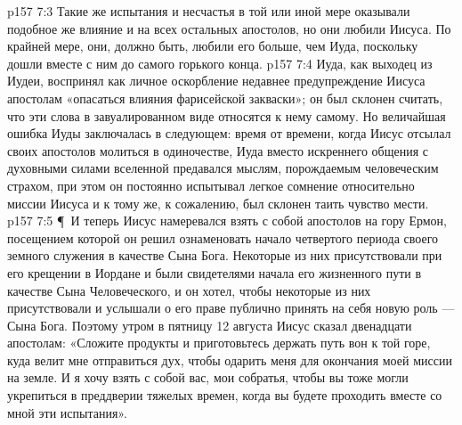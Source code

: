 \vs p157 7:3 Такие же испытания и несчастья в той или иной мере оказывали подобное же влияние и на всех остальных апостолов, но они любили Иисуса. По крайней мере, они, должно быть, любили его больше, чем Иуда, поскольку дошли вместе с ним до самого горького конца.
\vs p157 7:4 Иуда, как выходец из Иудеи, воспринял как личное оскорбление недавнее предупреждение Иисуса апостолам «опасаться влияния фарисейской закваски»; он был склонен считать, что эти слова в завуалированном виде относятся к нему самому. Но величайшая ошибка Иуды заключалась в следующем: время от времени, когда Иисус отсылал своих апостолов молиться в одиночестве, Иуда вместо искреннего общения с духовными силами вселенной предавался мыслям, порождаемым человеческим страхом, при этом он постоянно испытывал легкое сомнение относительно миссии Иисуса и к тому же, к сожалению, был склонен таить чувство мести.
\vs p157 7:5 \P\ И теперь Иисус намеревался взять с собой апостолов на гору Ермон, посещением которой он решил ознаменовать начало четвертого периода своего земного служения в качестве Сына Бога. Некоторые из них присутствовали при его крещении в Иордане и были свидетелями начала его жизненного пути в качестве Сына Человеческого, и он хотел, чтобы некоторые из них присутствовали и услышали о его праве публично принять на себя новую роль --- Сына Бога. Поэтому утром в пятницу 12 августа Иисус сказал двенадцати апостолам: «Сложите продукты и приготовьтесь держать путь вон к той горе, куда велит мне отправиться дух, чтобы одарить меня для окончания моей миссии на земле. И я хочу взять с собой вас, мои собратья, чтобы вы тоже могли укрепиться в преддверии тяжелых времен, когда вы будете проходить вместе со мной эти испытания».
